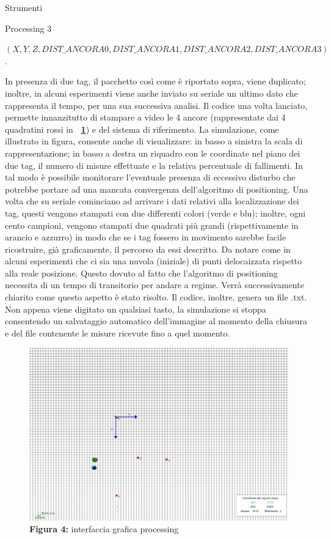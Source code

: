 \documentclass[12pt]{report}
\begin{document}
\begin{section}{Strumenti}
\begin{subsection}{Processing 3}
		\begin{footnotesize}$(X,     Y,    Z,    DIST\_ANCORA0,    DIST\_ANCORA1,    DIST\_ANCORA2,    DIST\_ANCORA3)$.\end{footnotesize}

		In presenza di due tag, il pacchetto così come è riportato sopra, viene duplicato; inoltre, in alcuni esperimenti viene anche inviato su seriale un ultimo dato che rappresenta il tempo, per una sua successiva analisi. Il codice una volta lanciato, permette innanzitutto di stampare a video le 4 ancore (rappresentate dai 			4 quadratini rossi in \textbf{\figurename~\ref{Ffunzionamento_processing}}) e del sistema di riferimento. La simulazione, come illustrato in figura, consente anche di visualizzare: in basso a sinistra la scala di rappresentazione; in basso a destra un riquadro con le coordinate nel piano dei due tag, il numero di 					misure effettuate e la relativa percentuale di fallimenti. In tal modo è possibile monitorare l’eventuale presenza di eccessivo disturbo che potrebbe portare ad una mancata convergenza dell’algoritmo di positioning. Una volta che su seriale cominciano ad arrivare i dati relativi alla localizzazione dei tag, questi 						vengono stampati con due differenti colori (verde e blu); inoltre, ogni cento campioni, vengono stampati due quadrati più grandi (rispettivamente in arancio e azzurro) in modo che se i tag fossero in movimento sarebbe facile ricostruire, già graficamente, il percorso da essi descritto. Da notare come in alcuni 					esperimenti che ci sia una nuvola (iniziale) di punti delocaizzata rispetto alla reale posizione. Questo dovuto al fatto che l'algoritmo di positioning necessita di un tempo di transitorio per andare a regime. Verrà successivamente chiarito come questo aspetto è stato risolto. Il codice, inoltre, genera un file .txt. 						Non appena viene digitato un qualsiasi tasto, la simulazione si stoppa consentendo un salvataggio automatico dell’immagine al momento della chiusura e del file contenente le misure ricevute fino a quel momento.
		
		\begin{figure}[H]
			\centering
			\includegraphics[scale=0.9]{processing_dimostration}
	 		\caption{\textbf{Figura 4:} interfaccia grafica processing}\label{Ffunzionamento_processing}
		\end{figure}


\end{subsection}
\end{section}
\end{document}
